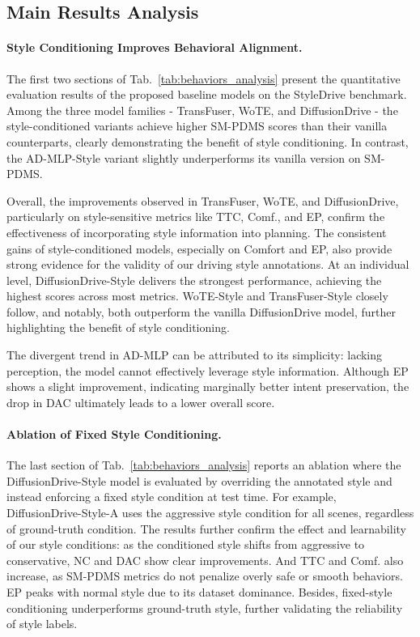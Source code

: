 \documentclass{article}
\begin{document}
\subsection{Main Results Analysis}

\paragraph{Style Conditioning Improves Behavioral Alignment.}
The first two sections of Tab.~\ref{tab:behaviors_analysis} present the quantitative evaluation results of the proposed baseline models on the StyleDrive benchmark. Among the three model families - TransFuser, WoTE, and DiffusionDrive - the style-conditioned variants achieve higher SM-PDMS scores than their vanilla counterparts, clearly demonstrating the benefit of style conditioning. In contrast, the AD-MLP-Style variant slightly underperforms its vanilla version on SM-PDMS. 

Overall, the improvements observed in TransFuser, WoTE, and DiffusionDrive, particularly on style-sensitive metrics like TTC, Comf., and EP, confirm the effectiveness of incorporating style information into planning. The consistent gains of style-conditioned models, especially on Comfort and EP, also provide strong evidence for the validity of our driving style annotations. At an individual level, DiffusionDrive-Style delivers the strongest performance, achieving the highest scores across most metrics. WoTE-Style and TransFuser-Style closely follow, and notably, both outperform the vanilla DiffusionDrive model, further highlighting the benefit of style conditioning. 

The divergent trend in AD-MLP can be attributed to its simplicity: lacking perception, the model cannot effectively leverage style information. Although EP shows a slight improvement, indicating marginally better intent preservation, the drop in DAC ultimately leads to a lower overall score.


\paragraph{Ablation of Fixed Style Conditioning.}
The last section of Tab.~\ref{tab:behaviors_analysis} reports an ablation where the DiffusionDrive-Style model is evaluated by overriding the annotated style and instead enforcing a fixed style condition at test time. For example, DiffusionDrive-Style-A uses the aggressive style condition for all scenes, regardless of ground-truth condition. The results further confirm the effect and learnability of our style conditions: as the conditioned style shifts from aggressive to conservative, NC and DAC show clear improvements. And TTC and Comf. also increase, as SM-PDMS metrics do not penalize overly safe or smooth behaviors. EP peaks with normal style due to its dataset dominance. Besides, fixed-style conditioning underperforms ground-truth style, further validating the reliability of style labels.
\end{document}

